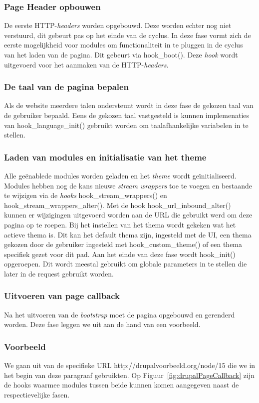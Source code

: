 \subsubsection{Page Header opbouwen}
De eerste HTTP-\textit{headers} worden opgebouwd. Deze worden echter nog niet verstuurd, dit gebeurt pas op het einde van de cyclus. In deze fase vormt zich de eerste mogelijkheid voor modules om functionaliteit in te pluggen in de cyclus van het laden van de pagina. Dit gebeurt via hook\_boot(). Deze \textit{hook} wordt uitgevoerd voor het aanmaken van de HTTP-\textit{headers}.

\subsubsection{De taal van de pagina bepalen}
Als de website meerdere talen ondersteunt wordt in deze fase de gekozen taal van de gebruiker bepaald. Eens de gekozen taal vastgesteld is kunnen implemenaties van hook\_language\_init() gebruikt worden om taalafhankelijke variabelen in te stellen.

\subsubsection{Laden van modules en initialisatie van het theme}
Alle ge\"{e}nablede modules worden geladen en het \textit{theme} wordt ge\"{i}nitialiseerd. Modules hebben nog de kans nieuwe \textit{stream wrappers} toe te voegen en bestaande te wijzigen via de \textit{hooks} hook\_stream\_wrappers() en hook\_stream\_wrappers\_alter(). Met de hook hook\_url\_inbound\_alter() kunnen er wijzigingen uitgevoerd worden aan de URL die gebruikt werd om deze pagina op te roepen. Bij het instellen van het thema wordt gekeken wat het actieve thema is. Dit kan het default thema zijn, ingesteld met de UI, een thema gekozen door de gebruiker ingesteld met hook\_custom\_theme() of een thema specifiek gezet voor dit pad. Aan het einde van deze fase wordt hook\_init() opgeroepen. Dit wordt meestal gebruikt om globale parameters in te stellen die later in de request gebruikt worden.

\subsubsection{Uitvoeren van page callback}
Na het uitvoeren van de \textit{bootstrap} moet de pagina opgebouwd en gerenderd worden. Deze fase leggen we uit aan de hand van een voorbeeld.

\subsubsection{Voorbeeld}
We gaan uit van de specifieke URL http://drupalvoorbeeld.org/node/15 die we in het begin van deze paragraaf gebruikten. Op Figuur~\ref{fig:drupalPageCallback} zijn de hooks waarmee modules tussen beide kunnen komen aangegeven naast de respectievelijke fasen.\\

